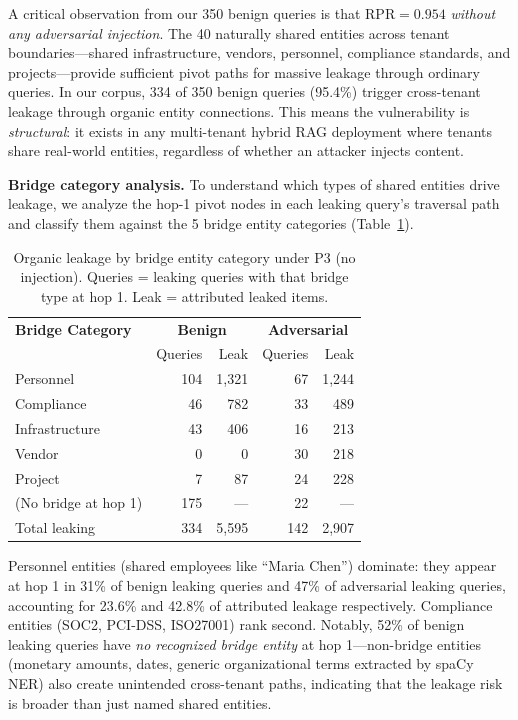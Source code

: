 \documentclass[letterpaper,twocolumn,10pt]{article}
\begin{document}
A critical observation from our 350 benign queries is that
$\text{RPR} = 0.954$ \emph{without any adversarial injection}. The
40 naturally shared entities across tenant boundaries---shared
infrastructure, vendors, personnel, compliance standards, and
projects---provide sufficient pivot paths for massive leakage through
ordinary queries. In our corpus, 334 of 350 benign queries (95.4\%)
trigger cross-tenant leakage through organic entity connections. This
means the vulnerability is \emph{structural}: it exists in any
multi-tenant hybrid RAG deployment where tenants share real-world
entities, regardless of whether an attacker injects content.

\textbf{Bridge category analysis.} To understand which types of
shared entities drive leakage, we analyze the hop-1 pivot nodes in
each leaking query's traversal path and classify them against the 5
bridge entity categories (Table~\ref{tab:organic-leakage}).

\begin{table}[t]
\centering
\caption{Organic leakage by bridge entity category under P3 (no
  injection). Queries = leaking queries with that bridge type at
  hop 1. Leak = attributed leaked items.}
\label{tab:organic-leakage}
\small
\begin{tabular}{l|rr|rr}
\toprule
\textbf{Bridge Category} & \multicolumn{2}{c|}{\textbf{Benign}} &
  \multicolumn{2}{c}{\textbf{Adversarial}} \\
 & Queries & Leak & Queries & Leak \\
\midrule
  Personnel & 104 & 1{,}321 & 67 & 1{,}244 \\
  Compliance & 46 & 782 & 33 & 489 \\
  Infrastructure & 43 & 406 & 16 & 213 \\
  Vendor & 0 & 0 & 30 & 218 \\
  Project & 7 & 87 & 24 & 228 \\
\midrule
  (No bridge at hop 1) & 175 & --- & 22 & --- \\
\midrule
  Total leaking & 334 & 5{,}595 & 142 & 2{,}907 \\
\bottomrule
\end{tabular}
\end{table}

Personnel entities (shared employees like ``Maria Chen'') dominate:
they appear at hop 1 in 31\% of benign leaking queries and 47\% of
adversarial leaking queries, accounting for 23.6\% and 42.8\% of
attributed leakage respectively. Compliance entities (SOC2, PCI-DSS,
ISO27001) rank second. Notably, 52\% of benign leaking queries have
\emph{no recognized bridge entity} at hop 1---non-bridge entities
(monetary amounts, dates, generic organizational terms extracted by
spaCy NER) also create unintended cross-tenant paths, indicating
that the leakage risk is broader than just named shared entities.
\end{document}
